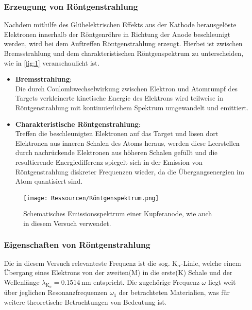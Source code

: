 \documentclass[12pt]{article}
\begin{document}
\subsubsection{Erzeugung von Röntgenstrahlung}
Nachdem mithilfe des Glühelektrischen Effekts aus der Kathode herausgelöste Elektronen innerhalb der Röntgenröhre in Richtung der Anode beschleunigt werden, wird bei dem Auftreffen Röntgenstrahlung erzeugt.
Hierbei ist zwischen Bremsstrahlung und dem charakteristischen Röntgenspektrum zu unterscheiden, wie in \autoref{fig:1} veranschaulicht ist.
\begin{itemize}
  \item \textbf{Bremsstrahlung}:\\Die durch Coulombwechselwirkung zwischen Elektron und Atomrumpf des Targets verkleinerte kinetische Energie des Elektrons wird teilweise in Röntgenstrahlung mit kontinuierlichem Spektrum umgewandelt und emittiert.
  \item \textbf{Charakteristische Röntgenstrahlung}:\\Treffen die beschleunigten Elektronen auf das Target und lösen dort Elektronen aus inneren Schalen des Atoms heraus, werden diese Leerstellen durch nachrückende Elektronen aus höheren Schalen gefüllt und die resultierende Energiedifferenz spiegelt sich in der Emission von Röntgenstrahlung diskreter Frequenzen wieder, da die Übergangsenergien im Atom quantisiert sind.
\end{itemize}
\begin{figure}[H]
  \centering
  \texttt{[image: Ressourcen/Röntgenspektrum.png]}
  \caption{Schematisches Emissionsspektrum einer Kupferanode, wie auch\\in diesem Versuch verwendet.\cite{ROEDresden}}\label{fig:1}
\end{figure}
\subsubsection{Eigenschaften von Röntgenstrahlung}
Die in diesem Versuch relevanteste Frequenz ist die sog. $\text{K}_\alpha$-Linie, welche einem Übergang eines Elektrons von der zweiten(M) in die erste(K) Schale und der Wellenlänge $\lambda_{\text{K}_\alpha}=\SI{0.1514}{\nano\meter}$ entspricht\cite{ekabs}.
Die zugehörige Frequenz $\omega$ liegt weit über jeglichen Resonanzfrequenzen $\omega_1$ der betrachteten Materialien, was für weitere theoretische Betrachtungen von Bedeutung ist.
\end{document}
